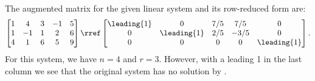 The augmented matrix for the given linear system and its row-reduced form are:
\begin{align*}
\begin{bmatrix}
1 & 4 & 3 & -1 & 5\\
1 & -1 & 1 & 2 & 6\\
4 & 1 & 6 & 5 & 9
\end{bmatrix}
\rref
\begin{bmatrix}
\leading{1} & 0 & 7/5 & 7/5 & 0\\
0 & \leading{1} & 2/5 & -3/5 & 0\\
0 & 0 & 0 & 0 & \leading{1} 
\end{bmatrix}.
\end{align*}
For this system, we have $n = 4$ and $r = 3$.  However, with a leading 1 in the last column we see that the original system has no solution by .
